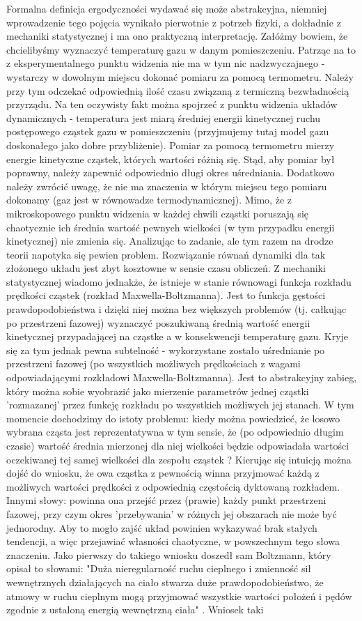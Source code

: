 \documentclass[12pt]{article}
\begin{document}
Formalna definicja ergodyczności wydawać się może abstrakcyjna, niemniej wprowadzenie tego pojęcia wynikało pierwotnie z potrzeb fizyki, a dokładnie z mechaniki statystycznej i ma ono praktyczną interpretację. Załóżmy bowiem, że chcielibyśmy wyznaczyć temperaturę gazu w danym pomieszczeniu. Patrząc na to z eksperymentalnego punktu widzenia nie ma w tym nic nadzwyczajnego - wystarczy w dowolnym miejscu dokonać pomiaru za pomocą termometru. Należy przy tym odczekać odpowiednią ilość czasu związaną z termiczną bezwładnością przyrządu. Na ten oczywisty fakt można spojrzeć z punktu widzenia układów dynamicznych - temperatura jest miarą średniej energii kinetycznej ruchu postępowego cząstek gazu w pomieszczeniu (przyjmujemy tutaj model gazu doskonałego jako dobre przybliżenie). Pomiar za pomocą termometru mierzy energie kinetyczne cząstek, których wartości różnią się. Stąd, aby pomiar był poprawny, należy zapewnić odpowiednio długi okres uśredniania. Dodatkowo należy zwrócić uwagę, że nie ma znaczenia w którym miejscu tego pomiaru dokonamy (gaz jest w równowadze termodynamicznej). Mimo, że z mikroskopowego punktu widzenia w każdej chwili cząstki poruszają się chaotycznie ich średnia wartość pewnych wielkości (w tym przypadku energii kinetycznej) nie zmienia się. Analizując to zadanie, ale tym razem na drodze teorii napotyka się pewien problem. Rozwiązanie równań dynamiki dla tak złożonego układu jest zbyt kosztowne w sensie czasu obliczeń. Z mechaniki statystycznej wiadomo jednakże, że istnieje w stanie równowagi funkcja rozkładu prędkości cząstek (rozkład Maxwella-Boltzmanna). Jest to funkcja gęstości prawdopodobieństwa i dzięki niej można bez większych problemów (tj. całkując po przestrzeni fazowej) wyznaczyć poszukiwaną średnią wartość energii kinetycznej przypadającej na cząstke a w konsekwencji temperaturę gazu. Kryje się za tym jednak pewna subtelność - wykorzystane zostało uśrednianie po przestrzeni fazowej (po wszystkich możliwych prędkościach z wagami odpowiadającymi rozkładowi  Maxwella-Boltzmanna). Jest to abstrakcyjny zabieg, który można sobie wyobrazić jako mierzenie parametrów jednej cząstki 'rozmazanej' przez funkcję rozkładu po wszystkich możliwych jej stanach. W tym momencie dochodzimy do istoty problemu: kiedy można powiedzieć, że losowo wybrana cząsta jest reprezentatywna w tym sensie, że (po odpowiednio długim czasie) wartość średnia mierzonej dla niej wielkości będzie odpowiadała wartości oczekiwanej tej samej wielkości dla zespołu cząstek ? Kierując się intuicją można dojść do wniosku, że owa cząstka z pewnością winna przyjmować każdą z możliwych wartości prędkości z odpowiednią częstością dyktowaną rozkładem. Innymi słowy: powinna ona przejść przez (prawie) każdy punkt przestrzeni fazowej, przy czym okres 'przebywania' w różnych jej obszarach nie może być jednorodny. Aby to mogło zajść układ powinien wykazywać brak stałych tendencji, a więc przejawiać własności chaotyczne, w powszechnym tego słowa znaczeniu. Jako pierwszy do takiego wniosku doszedł sam Boltzmann, który opisał to słowami: "Duża nieregularność ruchu cieplnego i zmienność sił wewnętrznych działających na ciało stwarza duże prawdopodobieństwo, że atmowy w ruchu cieplnym mogą przyjmować wszystkie wartości położeń i pędów zgodnie z ustaloną energią wewnętrzną ciała" \cite{Tempczyk}. Wniosek taki 
\end{document}
